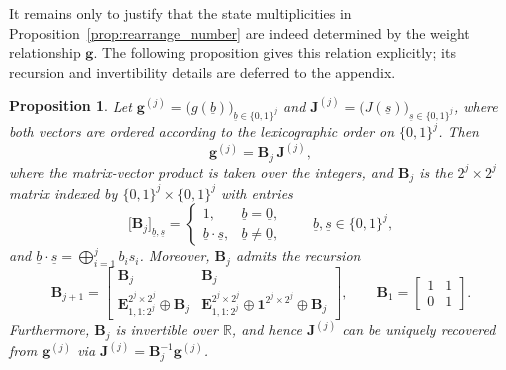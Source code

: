 \documentclass[letterpaper,draftclsnofoot,onecolumn]{IEEEtran}
\newtheorem{proposition}{Proposition}
\begin{document}
It remains only to justify that the state multiplicities in Proposition~\ref{prop:rearrange_number} are indeed determined by the weight relationship $\mathbf{g}$. The following proposition gives this relation explicitly; its recursion and invertibility details are deferred to the appendix.

\begin{proposition}\label{prop:Bj_recursion}
Let $\mathbf{g}^{(j)}=\bigl(g(\underline{b})\bigr)_{\underline{b}\in\{0,1\}^j}$ and $\mathbf{J}^{(j)}=\bigl(J(\underline{s})\bigr)_{\underline{s}\in\{0,1\}^j}$, where both vectors are ordered according to the lexicographic order on $\{0,1\}^j$. Then
\begin{equation}\label{eq:relation_g_and_j_matrix}
\mathbf{g}^{(j)}=\mathbf{B}_j\,\mathbf{J}^{(j)},
\end{equation}
where the matrix-vector product is taken over the integers, and $\mathbf{B}_j$ is the $2^j\times 2^j$ matrix indexed by $\{0,1\}^j\times\{0,1\}^j$ with entries
\begin{equation}\label{eq:Bj_entry_new}
\bigl[\mathbf{B}_j\bigr]_{\underline{b},\underline{s}}
=
\begin{cases}
1, & \underline{b}=\underline{0},\\
\underline{b}\cdot \underline{s}, & \underline{b}\neq \underline{0},
\end{cases}
\qquad
\underline{b},\underline{s}\in\{0,1\}^j,
\end{equation}
and $\underline{b}\cdot \underline{s}=\bigoplus_{i=1}^j b_i s_i$.
Moreover, $\mathbf{B}_j$ admits the recursion
\begin{equation}\label{eq:Bj_recursion_new}
\mathbf{B}_{j+1}
=
\begin{bmatrix}
\mathbf{B}_j & \mathbf{B}_j\\
\mathbf{E}^{2^j\times 2^j}_{1,1:2^j}\oplus \mathbf{B}_j &
\mathbf{E}^{2^j\times 2^j}_{1,1:2^j}\oplus \mathbf{1}^{2^j\times 2^j}\oplus \mathbf{B}_j
\end{bmatrix},
\qquad
\mathbf{B}_1=
\begin{bmatrix}
1 & 1\\
0 & 1
\end{bmatrix}.
\end{equation}
Furthermore, $\mathbf{B}_j$ is invertible over $\mathbb{R}$, and hence $\mathbf{J}^{(j)}$ can be uniquely recovered from $\mathbf{g}^{(j)}$ via $\mathbf{J}^{(j)}=\mathbf{B}_j^{-1}\mathbf{g}^{(j)}$.
\end{proposition}
\end{document}
